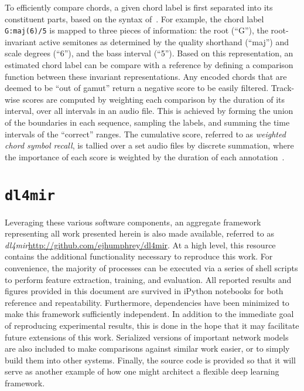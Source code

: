 To efficiently compare chords, a given chord label is first separated into its
constituent parts, based on the syntax of~\cite{harte2010towards}.
For example, the chord label \texttt{G:maj(6)/5} is mapped to three pieces of information: the root (``G''), the root-invariant active semitones as determined by the quality shorthand (``maj'') and scale degrees (``6''), and the bass interval (``5'').
Based on this representation, an estimated chord label can be compare with a reference by defining a comparison function between these invariant representations.
Any encoded chords that are deemed to be ``out of gamut'' return a negative score to be easily filtered.
Track-wise scores are computed by weighting each comparison by the duration of its interval, over all intervals in an audio file.
This is achieved by forming the union of the boundaries in each sequence, sampling the labels, and summing the time intervals of the ``correct'' ranges.
The cumulative score, referred to as \emph{weighted chord symbol recall}, is tallied over a set audio files by discrete summation, where the importance of each score is weighted by the duration of each annotation~\cite{cho2013mirex}.


\section{\texttt{dl4mir}}
\label{sec:dl4mir}

Leveraging these various software components, an aggregate framework representing all work presented herein is also made available, referred to as \emph{dl4mir}\url{http://github.com/ejhumphrey/dl4mir}.
At a high level, this resource contains the additional functionality necessary to reproduce this work.
For convenience, the majority of processes can be executed via a series of shell scripts to perform feature extraction, training, and evaluation.
All reported results and figures provided in this document are survived in iPython notebooks for both reference and repeatability.
Furthermore, dependencies have been minimized to make this framework sufficiently independent.
In addition to the immediate goal of reproducing experimental results, this is done in the hope that it may facilitate future extensions of this work.
Serialized versions of important network models are also included to make comparisons against similar work easier, or to simply build them into other systems.
Finally, the source code is provided so that it will serve as another example of how one might architect a flexible deep learning framework.


